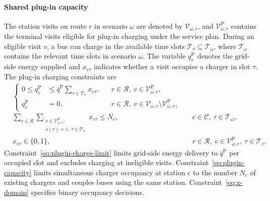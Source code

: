\paragraph{Shared plug-in capacity}
The station visits on route $r$ in scenario $\omega$ are denoted by $\mathcal V_{\omega,r}$, and $\mathcal V^{\mathrm P}_{\omega,r}$ contains the terminal visits eligible for plug-in charging under the service plan.
During an eligible visit $v$, a bus can charge in the available time slots $\mathcal T_v\subseteq\mathcal T_\omega$, where $\mathcal T_\omega$ contains the relevant time slots in scenario $\omega$.
The variable $q_v^{\mathrm P}$ denotes the grid-side energy supplied and $x_{v\tau}$ indicates whether a visit occupies a charger in slot $\tau$.
The plug-in charging constraints are
\begin{align}
    & \left\{\begin{aligned}
        0 \leq q_v^{\mathrm P}
        &\leq \bar q^{\mathrm P}\sum_{\tau\in\mathcal T_v}x_{v\tau},
        && r\in\mathcal R,\ v\in\mathcal V^{\mathrm P}_{\omega,r}, \\
        q_v^{\mathrm P} &= 0,
        && r\in\mathcal R,\ v\in\mathcal V_{\omega,r}\setminus\mathcal V^{\mathrm P}_{\omega,r},
    \end{aligned}\right.
    \label{eq:plugin-charge-limit} \\
    & \sum_{r \in \mathcal{R}}
    \sum_{\substack{v \in \mathcal{V}^{\mathrm{P}}_{\omega,r}:\\ s(v)=c,\ \tau\in\mathcal{T}_v}}
    x_{v\tau}
    \leq
    N_c,
    && c \in \mathcal{C},\ \tau \in \mathcal{T}_\omega,
    \label{eq:plugin-capacity} \\
    & x_{v\tau} \in \{0,1\},
    && r \in \mathcal{R},\ v \in \mathcal{V}^{\mathrm{P}}_{\omega,r},\ \tau \in \mathcal{T}_v.
    \label{eq:x-domain}
\end{align}
Constraint~\eqref{eq:plugin-charge-limit} limits grid-side energy delivery to $\bar q^{\mathrm P}$ per occupied slot and excludes charging at ineligible visits.
Constraint~\eqref{eq:plugin-capacity} limits simultaneous charger occupancy at station $c$ to the number $N_c$ of existing chargers and couples buses using the same station.
Constraint~\eqref{eq:x-domain} specifies binary occupancy decisions.

